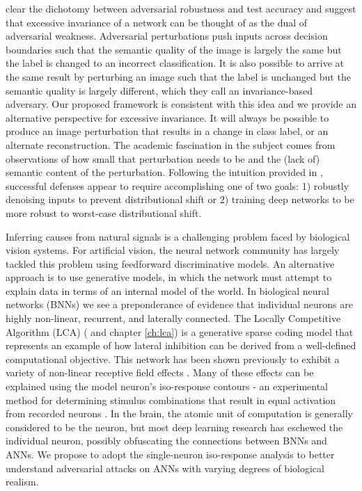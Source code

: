 clear the dichotomy between adversarial robustness and test accuracy and suggest that excessive invariance of a network can  be thought of as the dual of adversarial weakness. Adversarial perturbations push inputs across decision boundaries such that the semantic quality of the image is largely the same but the label is changed to an incorrect classification. It is also possible to arrive at the same result by perturbing an image such that the label is unchanged but the semantic quality is largely different, which they call an invariance-based adversary. Our proposed framework is consistent with this idea and we provide an alternative perspective for excessive invariance. It will always be possible to produce an image perturbation that results in a change in class label, or an alternate reconstruction. The academic fascination in the subject comes from observations of how small that perturbation needs to be and the (lack of) semantic content of the perturbation. Following the intuition provided in \parencite{ford2019adversarial}, successful defenses appear to require accomplishing one of two goals: 1) robustly denoising inputs to prevent distributional shift or 2) training deep networks to be more robust to worst-case distributional shift.

Inferring causes from natural signals is a challenging problem faced by biological vision systems. For artificial vision, the neural network community has largely tackled this problem using feedforward discriminative models. An alternative approach is to use generative models, in which the network must attempt to explain data in terms of an internal model of the world. In biological neural networks (BNNs) we see a preponderance of evidence that individual neurons are highly non-linear, recurrent, and laterally connected. The Locally Competitive Algorithm (LCA) (\cite{rozell2008sparse} and chapter \ref{ch:lca}) is a generative sparse coding model that represents an example of how lateral inhibition can be derived from a well-defined computational objective. This network has been shown previously to exhibit a variety of non-linear receptive field effects \parencite{zhu2013visual}. Many of these effects can be explained using the model neuron’s iso-response contours - an experimental method for determining stimulus combinations that result in equal activation from recorded neurons \parencite{golden2016conjectures}. In the brain, the atomic unit of computation is generally considered to be the neuron, but most deep learning research has eschewed the individual neuron, possibly obfuscating the connections between BNNs and ANNs. We propose to adopt the single-neuron iso-response analysis to better understand adversarial attacks on ANNs with varying degrees of biological realism.

